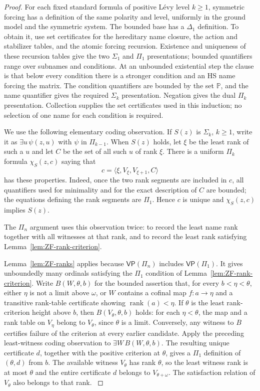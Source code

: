 \documentclass[11pt,a4paper]{amsart}
\newcommand{\VP}{\mathsf{VP}}
\newcommand{\rank}{\operatorname{rank}}
\theoremstyle{plain}
\theoremstyle{definition}
\theoremstyle{remark}
\begin{document}
\begin{proof}
{\color{auditgreen}
For each fixed standard formula of positive L\'evy level $k\geq1$, symmetric forcing has a definition of the same polarity and level, uniformly in the ground model and the symmetric system.  The bounded base has a $\Delta_1$ definition.  To obtain it, use set certificates for the hereditary name closure, the action and stabilizer tables, and the atomic forcing recursion.  Existence and uniqueness of these recursion tables give the two $\Sigma_1$ and $\Pi_1$ presentations; bounded quantifiers range over subnames and conditions.  At an unbounded existential step the clause is that below every condition there is a stronger condition and an HS name forcing the matrix.  The condition quantifiers are bounded by the set $\mathbb P$, and the name quantifier gives the required $\Sigma_k$ presentation.  Negation gives the dual $\Pi_k$ presentation.  Collection supplies the set certificates used in this induction; no selection of one name for each condition is required.
}

We use the following elementary coding observation.  If $S(z)$ is $\Sigma_k$, $k\geq1$, write it as $\exists u\,\psi(z,u)$ with $\psi$ in $\Pi_{k-1}$.  When $S(z)$ holds, let $\xi$ be the least rank of such a $u$ and let $C$ be the set of all such $u$ of rank $\xi$.  There is a uniform $\Pi_k$ formula $\chi_S(z,c)$ saying that
\[
c=\langle\xi,V_\xi,V_{\xi+1},C\rangle
\]
has these properties.  Indeed, once the two rank segments are included in $c$, all quantifiers used for minimality and for the exact description of $C$ are bounded; the equations defining the rank segments are $\Pi_1$.  Hence $c$ is unique and $\chi_S(z,c)$ implies $S(z)$.

The $\Pi_n$ argument uses this observation twice: to record the least name rank together with all witnesses at that rank, and to record the least rank satisfying Lemma~\ref{lem:ZF-rank-criterion}.

{\color{auditgreen}
Lemma~\ref{lem:ZF-ranks} applies because $\VP(\Pi_n)$ includes $\VP(\Pi_1)$.  It gives unboundedly many ordinals satisfying the $\Pi_1$ condition of Lemma~\ref{lem:ZF-rank-criterion}.  Write $B(W,\theta,b)$ for the bounded assertion that, for every $b<\eta<\theta$, either $\eta$ is not a limit above $\omega$, or $W$ contains a cofinal map $f:a\to\eta$ and a transitive rank-table certificate showing $\rank(a)<\eta$.  If $\theta$ is the least rank-criterion height above $b$, then $B(V_\theta,\theta,b)$ holds: for each $\eta<\theta$, the map and a rank table on $V_\eta$ belong to $V_\theta$, since $\theta$ is a limit.  Conversely, any witness to $B$ certifies failure of the criterion at every earlier candidate.  Apply the preceding least-witness coding observation to $\exists W\,B(W,\theta,b)$.  The resulting unique certificate $d$, together with the positive criterion at $\theta$, gives a $\Pi_1$ definition of $(\theta,d)$ from $b$.  The available witness $V_\theta$ has rank $\theta$, so the least witness rank is at most $\theta$ and the entire certificate $d$ belongs to $V_{\theta+\omega}$.  The satisfaction relation of $V_\theta$ also belongs to that rank.
}


\end{proof}
\end{document}
